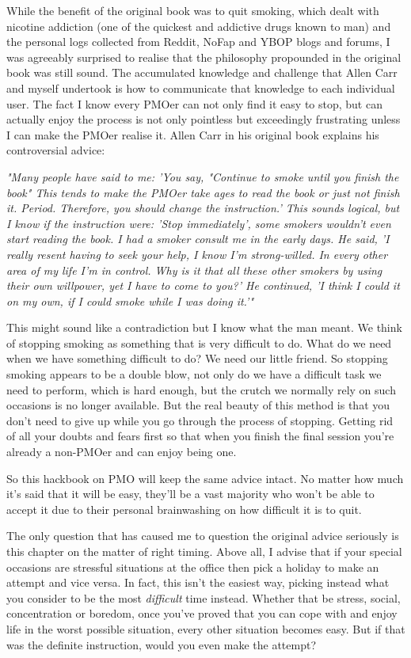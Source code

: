 \documentclass[easypeasy.tex]{subfiles}
\begin{document}
While the benefit of the original book was to quit smoking, which dealt with nicotine addiction (one of the quickest and addictive drugs known to man) and the personal logs collected from Reddit, NoFap and YBOP blogs and forums, I was agreeably surprised to realise that the philosophy propounded in the original book was still sound. The accumulated knowledge and challenge that Allen Carr and myself undertook is how to communicate that knowledge to each individual user. The fact I know every PMOer can not only find it easy to stop, but can actually enjoy the process is not only pointless but exceedingly frustrating unless I can make the PMOer realise it. Allen Carr in his original book explains his controversial advice:

  \textit{"Many people have said to me: 'You say, "Continue to smoke until you finish the book" This tends to make the PMOer take ages to read the book or just not finish it. Period. Therefore, you should change the instruction.' This sounds logical, but I know if the instruction were: 'Stop immediately', some smokers wouldn't even start reading the book. I had a smoker consult me in the early days. He said, 'I really resent having to seek your help, I know I'm strong-willed. In every other area of my life I'm in control. Why is it that all these other smokers by using their own willpower, yet I have to come to you?' He continued, 'I think I could it on my own, if I could smoke while I was doing it.'"}

This might sound like a contradiction but I know what the man meant. We think of stopping smoking as something that is very difficult to do. What do we need when we have something difficult to do? We need our little friend. So stopping smoking appears to be a double blow, not only do we have a difficult task we need to perform, which is hard enough, but the crutch we normally rely on such occasions is no longer available. But the real beauty of this method is that you don't need to give up while you go through the process of stopping. Getting rid of all your doubts and fears first so that when you finish the final session you're already a non-PMOer and can enjoy being one.

So this hackbook on PMO will keep the same advice intact. No matter how much it's said that it will be easy, they'll be a vast majority who won't be able to accept it due to their personal brainwashing on how difficult it is to quit.

The only question that has caused me to question the original advice seriously is this chapter on the matter of right timing. Above all, I advise that if your special occasions are stressful situations at the office then pick a holiday to make an attempt and vice versa. In fact, this isn't the easiest way, picking instead what you consider to be the most \textit{difficult} time instead. Whether that be stress, social, concentration or boredom, once you've proved that you can cope with and enjoy life in the worst possible situation, every other situation becomes easy. But if that was the definite instruction, would you even make the attempt?
\end{document}
